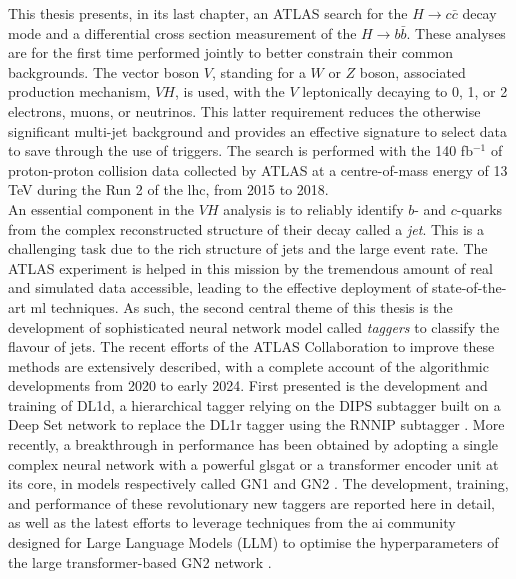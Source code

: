 \newpage
This thesis presents, in its last chapter, an ATLAS search for the $H \rightarrow c\bar{c}$ decay mode and a differential cross section measurement of the $H \rightarrow b\bar{b}$. These analyses are for the first time performed jointly to better constrain their common backgrounds. The vector boson $V$, standing for a $W$ or $Z$ boson, associated production mechanism, $VH$, is used, with the $V$ leptonically decaying to 0, 1, or 2 electrons, muons, or neutrinos. This latter requirement reduces the otherwise significant multi-jet background and provides an effective signature to select data to save through the use of triggers. The search is performed with the 140 fb$^{-1}$ of proton-proton collision data collected by ATLAS at a centre-of-mass energy of 13 TeV during the Run 2 of the \gls{lhc}, from 2015 to 2018. \\

An essential component in the $VH$ analysis is to reliably identify $b$- and $c$-quarks from the complex reconstructed structure of their decay called a \textit{jet}. This is a challenging task due to the rich structure of jets and the large event rate. The ATLAS experiment is helped in this mission by the tremendous amount of real and simulated data accessible, leading to the effective deployment of state-of-the-art \gls{ml} techniques. As such, the second central theme of this thesis is the development of sophisticated neural network model called \textit{taggers} to classify the flavour of jets. The recent efforts of the ATLAS Collaboration to improve these methods are extensively described, with a complete account of the algorithmic developments from 2020 to early 2024. First presented is the development and training of DL1d, a hierarchical tagger relying on the DIPS subtagger built on a Deep Set network to replace the DL1r tagger using the RNNIP subtagger \cite{ATL-PLOT-FTAG-2023-01}. More recently, a breakthrough in performance has been obtained by adopting a single complex neural network with a powerful gls{gat} or a transformer encoder unit at its core, in models respectively called GN1 \cite{ATL-PHYS-PUB-2022-027} and GN2 \cite{duperrin2023flavour}. The development, training, and performance of these revolutionary new taggers are reported here in detail, as well as the latest efforts to leverage techniques from the \gls{ai} community designed for Large Language Models (LLM) to optimise the hyperparameters of the large transformer-based GN2 network \cite{yang2021tuning, publicplotMUP}. \\


